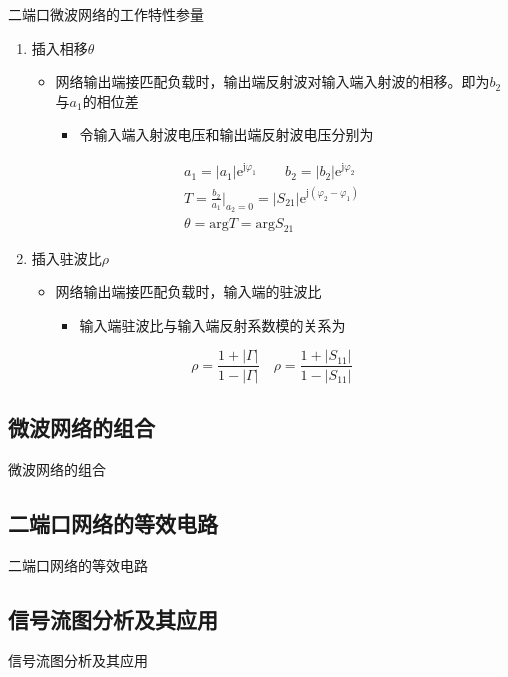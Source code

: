 \begin{frame}{二端口微波网络的工作特性参量}
    \begin{enumerate}
        \resume
        \item 插入相移$\theta$
              \begin{itemize}
                  \item 网络输出端接匹配负载时，输出端反射波对输入端入射波的相移。即为$b_2$与$a_1$的相位差
                        \begin{itemize}
                            \item 令输入端入射波电压和输出端反射波电压分别为
                        \end{itemize}
              \end{itemize}
              \begin{gather*}
                  a_1=\lvert a_1\rvert\mathrm{e}^{\mathrm{j}\varphi_1} \qquad b_2=\lvert b_2\rvert\mathrm{e}^{\mathrm{j}\varphi_2}\\
                  T=\frac{b_2}{a_1}\bigg|_{a_2=0}=\lvert S_{21}\rvert\mathrm{e}^{\mathrm{j}(\varphi_2-\varphi_1)} \\
                  \theta=\mathrm{arg}T=\mathrm{arg}S_{21}
              \end{gather*}
        \item 插入驻波比$\rho$
              \begin{itemize}
                  \item 网络输出端接匹配负载时，输入端的驻波比
                        \begin{itemize}
                            \item 输入端驻波比与输入端反射系数模的关系为
                        \end{itemize}
              \end{itemize}
              $$\rho=\frac{1+|\Gamma|}{1-|\Gamma|} \quad \rho=\frac{1+|S_{11}|}{1-|S_{11}|}$$
    \end{enumerate}
\end{frame}

\subsection{微波网络的组合}
\begin{frame}{微波网络的组合}

\end{frame}

\subsection{二端口网络的等效电路}
\begin{frame}{二端口网络的等效电路}

\end{frame}

\subsection{信号流图分析及其应用}
\begin{frame}{信号流图分析及其应用}

\end{frame}

